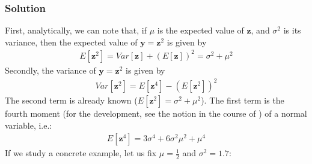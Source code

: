 \documentclass[letterpaper,10pt,english]{jupyterBook}
\begin{document}
\subsubsection{Solution}
\label{\detokenize{01:id4}}
\sphinxAtStartPar
First, analytically, we can note that, if \(\mu\) is the expected value of \(\mathbf{z}\), and  \(\sigma^2\) is its variance, then the expected value of \(\mathbf{y}=\mathbf{z}^2\) is given by
\begin{equation*}
\begin{split}
    E[\mathbf z^2] = Var[\mathbf z] + (E[\mathbf z])^2 = \sigma^2 + \mu^2
\end{split}
\end{equation*}
\sphinxAtStartPar
Secondly, the variance of \(\mathbf y=\mathbf z^2\) is given by
\begin{equation*}
\begin{split}
    Var[\mathbf z^2] = E[\mathbf z^4]-(E[\mathbf z^2])^2
\end{split}
\end{equation*}
\sphinxAtStartPar
The second term is already known (\(E[\mathbf z^2] = \sigma^2+\mu^2\)). The first term is the fourth moment (for the development, see the notion  in the course of ) of a normal variable, i.e.:
\begin{equation*}
\begin{split}
    E[\mathbf z^4] = 3\sigma^4 + 6\sigma^2\mu^2 + \mu^4
\end{split}
\end{equation*}
\sphinxAtStartPar
If we study a concrete example, let us fix \(\mu=\frac12\) and \(\sigma^2=1.7\):
\end{document}
